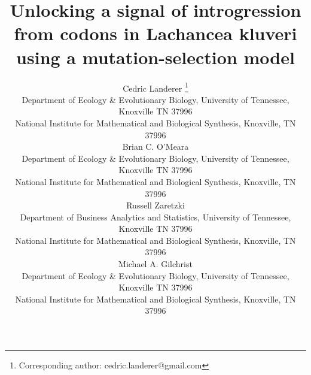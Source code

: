 \documentclass[fleqn,letterpaper]{article}
\begin{document}
\linenumbers

  \newcommand{\package}{\textbf{AnaCoDa}\xspace} %
  \newcommand{\kluyveri}{\textit{L. kluyveri}\xspace}
  \newcommand{\dubl}{\textit{C. dubliniensis}\xspace}
  \newcommand{\gossypii}{\textit{E. gossypii}\xspace}
  \newcommand{\ROC}{ROC SEMPPR\xspace}
  \newcommand{\GC}{GC content\xspace}
  \newcommand{\DM}{\ensuremath{{\Delta M}}\xspace}
  \newcommand{\DE}{\ensuremath{{\Delta \eta}}\xspace}
  \newcommand{\Lik}{\ensuremath{\mathcal{L}}\xspace}
  \newcommand{\GL}{\ensuremath{{\Delta s}}\xspace}

  
\title{Unlocking a signal of introgression from codons in Lachancea kluveri using a mutation-selection model}

\author{
  Cedric Landerer \thanks{Corresponding author: cedric.landerer@gmail.com}\\
  \small  Department of Ecology \& Evolutionary  Biology, University of Tennessee, Knoxville TN 37996\\
  \small National Institute for Mathematical and Biological Synthesis, Knoxville, TN 37996\\
  Brian C. O'Meara \\
  \small  Department of Ecology \& Evolutionary  Biology, University of Tennessee, Knoxville TN 37996\\
  \small National Institute for Mathematical and Biological Synthesis, Knoxville, TN 37996\\
  Russell Zaretzki\\ 
  \small Department of Business Analytics and Statistics, University of Tennessee, Knoxville TN 37996\\
  \small National Institute for Mathematical and Biological Synthesis, Knoxville, TN 37996\\
  Michael A. Gilchrist\\
  \small  Department of Ecology \& Evolutionary  Biology, University of Tennessee, Knoxville TN 37996\\
  \small National Institute for Mathematical and Biological Synthesis, Knoxville, TN 37996\\
}

\maketitle

\pagebreak
  
\end{document}
